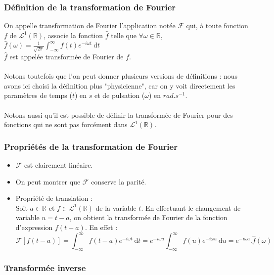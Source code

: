 \subsubsection{Définition de la transformation de Fourier}
 
On appelle transformation de Fourier l'application notée $\mathcal{F}$ qui, à toute fonction $f$ de  $\mathcal{L}^{1}(\mathbb{R})$, associe la fonction $\hat{f}$ telle que $\forall \omega \in \mathbb{R}$,$ \hat{f}(\omega)=\displaystyle{\frac{1}{\sqrt{2\pi}}\int_{-\infty}^{\infty}f(t)e^{-i\omega t}\:\mathrm{d}t}$
\\
$\hat{f}$ est appelée transformée de Fourier de $f$.
\\ \\
Notons toutefois que l'on peut donner plusieurs versions de définitions : nous avons ici choisi la définition plus "physicienne", car on y voit directement les paramètres de temps ($t$) en $s$ et de pulsation ($\omega$) en  $rad.s^{-1}$.
\\ \\
Notons aussi qu'il est possible de définir la transformée de Fourier pour des fonctions qui ne sont pas forcément dans $\mathcal{L}^{1}(\mathbb{R})$.
\\
\subsubsection{Propriétés de la transformation de Fourier} 
\begin{itemize}
\item $\mathcal{F}$ est clairement linéaire. \\
\item On peut montrer que $\mathcal{F}$ conserve la parité. \\
\item Propriété de translation : \\ Soit $a \in \mathbb{R}$ et $f\in \mathcal{L}^{1}(\mathbb{R})$ de la variable $t$. En effectuant le changement de variable $u=t-a$, on obtient la transformée de Fourier de la fonction d'expression $f(t-a)$. En effet : 
$$ \mathcal{F}[f(t-a)]=\displaystyle\int_{-\infty}^{\infty}f(t-a)e^{-i\omega t}\:\mathrm{d}t=\displaystyle e^{-i\omega a}\int_{-\infty}^{\infty}f(u)e^{-i \omega u}\:\mathrm{d}u=\displaystyle e^{-i\omega a}.\hat{f}(\omega) $$

\end{itemize}
 

\subsubsection{Transformée inverse}

